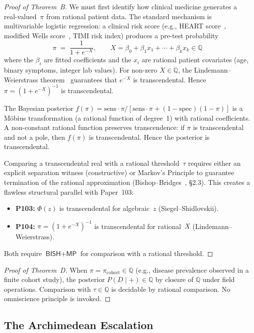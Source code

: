 \documentclass[11pt,a4paper]{article}
\theoremstyle{plain}
\theoremstyle{definition}
\newcommand{\BISH}{\textsf{BISH}}
\newcommand{\MP}{\textsf{MP}}
\newcommand{\Q}{\mathbb{Q}}
\begin{document}
\begin{proof}[Proof of Theorem~B]
We must first identify how clinical medicine generates a real-valued~$\pi$ from rational patient data.  The standard mechanism is multivariable logistic regression: a clinical risk score (e.g., HEART score~\cite{backus2013}, modified Wells score~\cite{wells2001}, TIMI risk index) produces a pre-test probability
\[
  \pi \;=\; \frac{1}{1 + e^{-X}}, \qquad X = \beta_0 + \beta_1 x_1 + \cdots + \beta_k x_k \in \Q
\]
where the $\beta_i$ are fitted coefficients and the $x_i$ are rational patient covariates (age, binary symptoms, integer lab values).  For non-zero $X \in \Q$, the Lindemann--Weierstrass theorem~\cite{baker1975} guarantees that $e^{-X}$ is transcendental.  Hence $\pi = (1 + e^{-X})^{-1}$ is transcendental.

The Bayesian posterior $f(\pi) = \mathrm{sens} \cdot \pi / [\mathrm{sens} \cdot \pi + (1 - \mathrm{spec})(1-\pi)]$ is a M\"obius transformation (a rational function of degree~1) with rational coefficients.  A non-constant rational function preserves transcendence: if $\pi$ is transcendental and not a pole, then $f(\pi)$ is transcendental.  Hence the posterior is transcendental.

Comparing a transcendental real with a rational threshold~$\tau$ requires either an explicit separation witness (constructive) or Markov's Principle to guarantee termination of the rational approximation (Bishop--Bridges~\cite{bishop-bridges}, \S2.3).  This creates a flawless structural parallel with Paper~103:
\begin{itemize}[nosep]
\item \textbf{P103:} $\Phi(z)$ is transcendental for algebraic~$z$ (Siegel--Shidlovskii).
\item \textbf{P104:} $\pi = (1+e^{-X})^{-1}$ is transcendental for rational~$X$ (Lindemann--Weierstrass).
\end{itemize}
Both require $\BISH + \MP$ for comparison with a rational threshold.
\end{proof}

\begin{proof}[Proof of Theorem~D]
When $\pi = \pi_{\mathrm{cohort}} \in \Q$ (e.g., disease prevalence observed in a finite cohort study), the posterior $P(D\mid+) \in \Q$ by closure of $\Q$ under field operations.  Comparison with $\tau \in \Q$ is decidable by rational comparison.  No omniscience principle is invoked.
\end{proof}

\subsection{The Archimedean Escalation}
\end{document}
